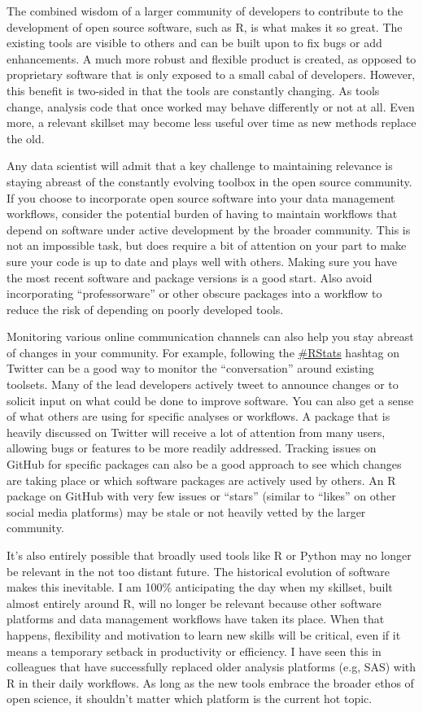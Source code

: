 \documentclass[
]{book}
\begin{document}
The combined wisdom of a larger community of developers to contribute to the development of open source software, such as R, is what makes it so great. The existing tools are visible to others and can be built upon to fix bugs or add enhancements. A much more robust and flexible product is created, as opposed to proprietary software that is only exposed to a small cabal of developers. However, this benefit is two-sided in that the tools are constantly changing. As tools change, analysis code that once worked may behave differently or not at all. Even more, a relevant skillset may become less useful over time as new methods replace the old.

Any data scientist will admit that a key challenge to maintaining relevance is staying abreast of the constantly evolving toolbox in the open source community. If you choose to incorporate open source software into your data management workflows, consider the potential burden of having to maintain workflows that depend on software under active development by the broader community. This is not an impossible task, but does require a bit of attention on your part to make sure your code is up to date and plays well with others. Making sure you have the most recent software and package versions is a good start. Also avoid incorporating ``professorware'' or other obscure packages into a workflow to reduce the risk of depending on poorly developed tools.

Monitoring various online communication channels can also help you stay abreast of changes in your community. For example, following the \href{https://twitter.com/hashtag/rstats}{\#RStats} hashtag on Twitter can be a good way to monitor the ``conversation'' around existing toolsets. Many of the lead developers actively tweet to announce changes or to solicit input on what could be done to improve software. You can also get a sense of what others are using for specific analyses or workflows. A package that is heavily discussed on Twitter will receive a lot of attention from many users, allowing bugs or features to be more readily addressed. Tracking issues on GitHub for specific packages can also be a good approach to see which changes are taking place or which software packages are actively used by others. An R package on GitHub with very few issues or ``stars'' (similar to ``likes'' on other social media platforms) may be stale or not heavily vetted by the larger community.

It's also entirely possible that broadly used tools like R or Python may no longer be relevant in the not too distant future. The historical evolution of software makes this inevitable. I am 100\% anticipating the day when my skillset, built almost entirely around R, will no longer be relevant because other software platforms and data management workflows have taken its place. When that happens, flexibility and motivation to learn new skills will be critical, even if it means a temporary setback in productivity or efficiency. I have seen this in colleagues that have successfully replaced older analysis platforms (e.g, SAS) with R in their daily workflows. As long as the new tools embrace the broader ethos of open science, it shouldn't matter which platform is the current hot topic.
\end{document}
